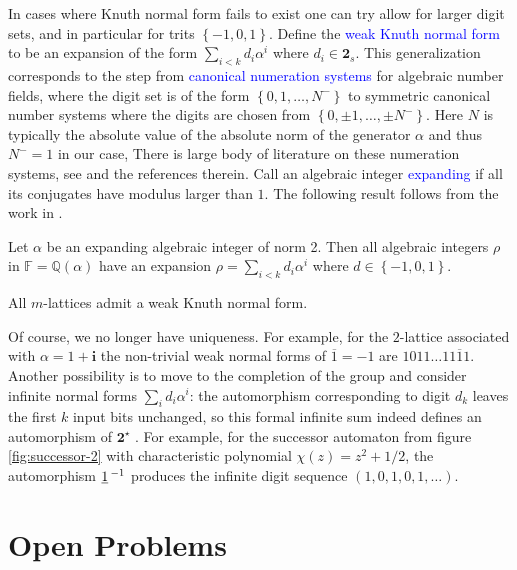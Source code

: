 \documentclass[12pt]{svmult}
\def\emph#1{\textcolor{blue}{#1}}
\def\2{\mathbf{2}}
\def\F#1{\underline{\smash{#1}}\,}       %
\def\FF{\mathbb{F}}
\def\SS{\Star{\2}}
\def\ii{\mathbf{i}}
\def\pre#1{{#1}^{-}}
\def\Q{\mathbb{Q}}
\def\setof#1{\left\{ {#1} \right\}}
\def\trtm{\overline{1}}
\def\tsym{\2_{s}}               %
\providecommand{\Star}[1]{{#1}^{\star}}
\begin{document}
In cases where Knuth normal form fails to exist one can try allow for larger digit 
sets, and in particular for trits $\setof{-1,0,1}$. 
Define the \emph{weak Knuth normal form} to be an expansion of the form 
$\sum_{i<k} d_{i} \alpha^{i}$ where $d_{i} \in \tsym$. 
This generalization corresponds to the step from \emph{canonical numeration systems} for 
algebraic number fields, where the digit set is of the form $\setof{0,1,\ldots,\pre{N}}$
to symmetric canonical number systems where the digits are chosen from 
$\setof{0,\pm 1,\ldots,\pm \pre{N}}$.
Here $N$ is typically the absolute value of the absolute norm of the generator $\alpha$ 
and thus $\pre{N} = 1$ in our case, 
There is large body of literature on these numeration systems, 
see \cite{Pethoe09:radix_represenations} and the references therein. 
Call an algebraic integer \emph{expanding} if all its conjugates have modulus larger than $1$.
The following result follows from the work in \cite{LagariasWang96:tiles,LagariasWang97:integral_tiles}.

\begin{theorem}
\label{thm:numeration}
Let $\alpha$ be an expanding algebraic integer of norm 2. 
Then all algebraic integers $\rho$ in $\FF = \Q(\alpha)$ have an expansion 
$\rho = \sum_{i<k} d_{i}\alpha^{i}$ where $d \in \setof{-1,0,1}$. 
\end{theorem}

\begin{corollary}
All $m$-lattices admit a weak Knuth normal form. 
\end{corollary}

Of course, we no longer have uniqueness. 
For example, for the $2$-lattice associated with $\alpha = 1 + \ii$ the 
non-trivial weak normal forms of $\trtm = -1$ are $1011 \ldots 11\trtm1$. 
Another possibility is to move to the completion of the group and consider
infinite normal forms  $\sum_{i} d_{i} \alpha^{i}$: the automorphism
corresponding to digit $d_k$ leaves the first $k$ input bits unchanged, so this formal infinite 
sum indeed defines an automorphism of $\SS$  \cite{Nekrashevych05:self_similar_groups}.
For example, for the successor automaton from figure \ref{fig:successor-2} with characteristic
polynomial $\chi(z) = z^{2} + 1/2$, the automorphism $\F{1}^{-1}$ produces the infinite 
digit sequence $(1,0,1,0,1,\ldots)$.


\section{Open Problems}
\label{sec:conjecture}
\end{document}
